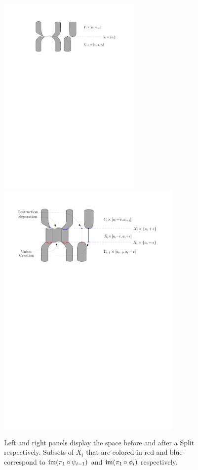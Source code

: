 \begin{figure}[h]
\begin{center}
\includegraphics[width=7cm]{figures/SplitBefore}\includegraphics[width=9cm]{figures/SplitAfter}
\caption[Up- and down-forks]{\label{fig:split}
Left and right panels display the space before and after a Split respectively.
Subsets of $X_i$ that are colored in red and blue correspond to $\mathrm{im}(\pi_1\circ\psi_{i-1})$
and $\mathrm{im}(\pi_1\circ\phi_i)$ respectively.}
\end{center}
\end{figure}

